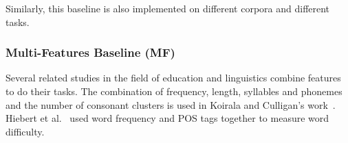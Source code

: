 Similarly, this baseline is also implemented on different corpora and different tasks.




\subsubsection{Multi-Features Baseline (MF)}
Several related studies in the field of education and linguistics combine features to do their tasks. 
The combination of frequency, length, syllables and phonemes and the number of consonant clusters is used in Koirala and Culligan's work~. 
Hiebert et al.~ used word frequency and POS tags together to measure word difficulty.

